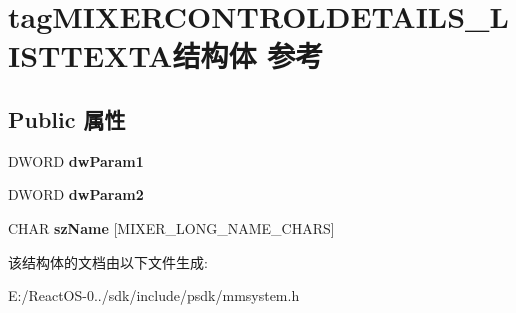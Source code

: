 \hypertarget{structtag_m_i_x_e_r_c_o_n_t_r_o_l_d_e_t_a_i_l_s___l_i_s_t_t_e_x_t_a}{}\section{tag\+M\+I\+X\+E\+R\+C\+O\+N\+T\+R\+O\+L\+D\+E\+T\+A\+I\+L\+S\+\_\+\+L\+I\+S\+T\+T\+E\+X\+T\+A结构体 参考}
\label{structtag_m_i_x_e_r_c_o_n_t_r_o_l_d_e_t_a_i_l_s___l_i_s_t_t_e_x_t_a}
\subsection*{Public 属性}
\begin{DoxyCompactItemize}
\item 
\mbox{\label{structtag_m_i_x_e_r_c_o_n_t_r_o_l_d_e_t_a_i_l_s___l_i_s_t_t_e_x_t_a_ac25099bef545c40559dc18e4c78a0ff6}} 
D\+W\+O\+RD {\bfseries dw\+Param1}
\item 
\mbox{\label{structtag_m_i_x_e_r_c_o_n_t_r_o_l_d_e_t_a_i_l_s___l_i_s_t_t_e_x_t_a_a59434a973e90fa52ec6f3e64346394d4}} 
D\+W\+O\+RD {\bfseries dw\+Param2}
\item 
\mbox{\label{structtag_m_i_x_e_r_c_o_n_t_r_o_l_d_e_t_a_i_l_s___l_i_s_t_t_e_x_t_a_ab8c44713f1fccaec8fb57812b6286881}} 
C\+H\+AR {\bfseries sz\+Name} \mbox{[}M\+I\+X\+E\+R\+\_\+\+L\+O\+N\+G\+\_\+\+N\+A\+M\+E\+\_\+\+C\+H\+A\+RS\mbox{]}
\end{DoxyCompactItemize}


该结构体的文档由以下文件生成\+:\begin{DoxyCompactItemize}
\item 
E\+:/\+React\+O\+S-\/0../sdk/include/psdk/mmsystem.\+h\end{DoxyCompactItemize}
